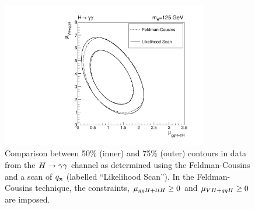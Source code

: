 \begin{figure}
\begin{center}
\includegraphics[width=0.8\textwidth]{combinations/compare-fc-lh.pdf}
\end{center}
\caption{Comparison between 50\% (inner) and 75\% (outer) contours in data from the $H\rightarrow\gamma\gamma$ 
channel as determined using the Feldman-Cousins and a scan of $q_{{\mathbf{x}}}$ (labelled ``Likelihood Scan'').
In the Feldman-Cousins technique, the constraints, $\mu_{ggH+ttH} \ge 0$ and $\mu_{VH+qqH} \ge 0$ are 
imposed. }
\label{fig:comparefclh}
\end{figure}
